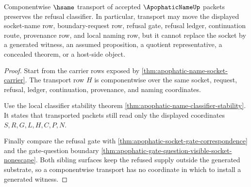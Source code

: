 \begin{theorem}
\label{thm:apophatic-name-refusal-classifier-stability}
Componentwise $\hsame$ transport of accepted $\ApophaticNameUp$ packets preserves the refusal classifier. In particular, transport may move the displayed socket-name row, boundary-request row, refusal gate, refusal ledger, continuation route, provenance row, and local naming row, but it cannot replace the socket by a generated witness, an assumed proposition, a quotient representative, a concealed theorem, or a host-side object.
\end{theorem}
\begin{proof}
Start from the carrier rows exposed by \autoref{thm:apophatic-name-socket-carrier}. The transport row $H$ is componentwise over the same socket, request, refusal, ledger, continuation, provenance, and naming coordinates.

Use the local classifier stability theorem \autoref{thm:apophatic-name-classifier-stability}. It states that transported packets still read only the displayed coordinates $S,R,G,L,H,C,P,N$.

Finally compare the refusal gate with \autoref{thm:apophatic-socket-gate-correspondence} and the gate-question boundary \autoref{thm:apophatic-gate-question-visible-socket-nonescape}. Both sibling surfaces keep the refused supply outside the generated substrate, so a componentwise transport has no coordinate in which to install a generated witness.
\end{proof}

